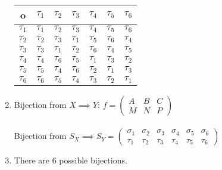 \begin{enumerate}[{a.}]
\begin{multicols}{2}
	\begin{tabular}{c| c c c c c c}
		o & $\tau_1$ & $\tau_2$ & $\tau_3$ & $\tau_4$ & $\tau_5$ & $\tau_6$\\
		\hline
		$\tau_1$ & $\tau_1$ & $\tau_2$ & $\tau_3$ & $\tau_4$ & $\tau_5$ & $\tau_6$\\
		$\tau_2$ & $\tau_2$ & $\tau_3$ & $\tau_1$ & $\tau_5$ & $\tau_6$ & $\tau_4$\\
		$\tau_3$ & $\tau_3$ & $\tau_1$ & $\tau_2$ & $\tau_6$ & $\tau_4$ & $\tau_5$\\
		$\tau_4$ & $\tau_4$ & $\tau_6$ & $\tau_5$ & $\tau_1$ & $\tau_3$ & $\tau_2$\\
		$\tau_5$ & $\tau_5$ & $\tau_4$ & $\tau_6$ & $\tau_2$ & $\tau_1$ & $\tau_3$\\
		$\tau_6$ & $\tau_6$ & $\tau_5$ & $\tau_4$ & $\tau_3$ & $\tau_2$ & $\tau_1$\\
	\end{tabular}
	\end{multicols}
	
\item
Bijection from $X\implies Y$:
$f = \begin{pmatrix}
A & B & C\\
M & N & P
\end{pmatrix}$\\
\\
Bijection from $S_X \implies S_Y = \begin{pmatrix}
\sigma_1 & \sigma_2 & \sigma_3 & \sigma_4 & \sigma_5 & \sigma_6\\
\tau_1 & \tau_2 & \tau_3 & \tau_4 & \tau_5 & \tau_6
\end{pmatrix}$

\item
There are 6 possible bijections.
\end{enumerate}

